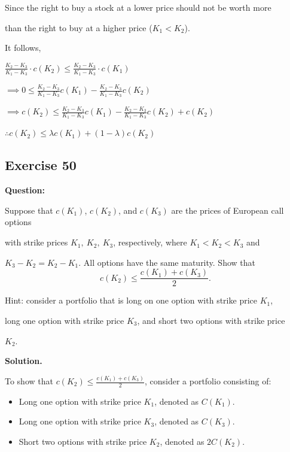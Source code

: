 \documentclass{article}
\begin{document}
Since the right to buy a stock at a lower price should not be worth more 

than the right to buy at a higher price ($K_1 < K_2$).

\vspace{\baselineskip}

It follows,

\vspace{\baselineskip}

$\frac{K_2 - K_3}{K_1 - K_3} \cdot c(K_2) \leq  \frac{K_2 - K_3}{K_1 - K_3} \cdot c(K_1)$ 

\vspace{\baselineskip}

$\implies 0 \leq \frac{K_2 - K_3}{K_1 - K_3}c(K_1) - \frac{K_2 - K_3}{K_1 - K_3}c(K_2)$

\vspace{\baselineskip}

$\implies c(K_2) \leq \frac{K_2 - K_3}{K_1 - K_3}c(K_1) - \frac{K_2 - K_3}{K_1 - K_3}c(K_2) + c(K_2)$

\vspace{\baselineskip}

$\therefore c(K_2)\leq \lambda c(K_1)+(1-\lambda)c(K_2)$


\subsection*{Exercise 50}
\textbf{Question:} 

Suppose that $c(K_1)$, $c(K_2)$, and $c(K_3)$ are the prices of European call options 

with strike prices $K_1,~K_2,~K_3$, respectively, where $K_1<K_2<K_3$ and 

$K_3-K_2=K_2-K_1$.  All options have the same maturity.  Show that $$c(K_2)\leq \frac{c(K_1)+c(K_3)}{2}.$$ 

Hint:  consider a portfolio that is long on one option with strike price $K_1$, 

long one option with strike price $K_3$, and short two options with strike price 

$K_2$.

\textbf{Solution.}

To show that $c(K_2)\leq \frac{c(K_1)+c(K_3)}{2}$, consider a portfolio consisting of:
\begin{itemize}
    \item Long one option with strike price $K_1$, denoted as $C(K_1)$.
    \item Long one option with strike price $K_3$, denoted as $C(K_3)$.
    \item Short two options with strike price $K_2$, denoted as $2C(K_2)$.
\end{itemize}
\end{document}
